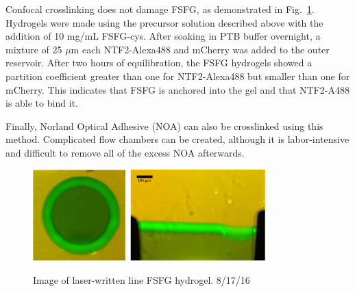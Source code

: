 Confocal crosslinking does not damage FSFG, as demonstrated in Fig.~\ref{fig:LW-NTF2-images}.  Hydrogels were made using the precursor solution described above with the addition of 10 mg/mL FSFG-cys.  After soaking in PTB buffer overnight, a mixture of 25 $\mu$m each NTF2-Alexa488 and mCherry was added to the outer reservoir.  After two hours of equilibration, the FSFG hydrogels showed a partition coefficient greater than one for NTF2-Alexa488 but smaller than one for mCherry.  This indicates that FSFG is anchored into the gel and that NTF2-A488 is able to bind it.

Finally, Norland Optical Adhesive (NOA) can also be crosslinked using this method.  Complicated flow chambers can be created, although it is labor-intensive and difficult to remove all of the excess NOA afterwards.

\begin{figure} %
\caption{Image of laser-written line FSFG hydrogel. 8/17/16}
\centering
\includegraphics[width=0.8\textwidth]{figs/ch03/example-LW-gels-NTF2}
\label{fig:LW-NTF2-images}
\end{figure} %

